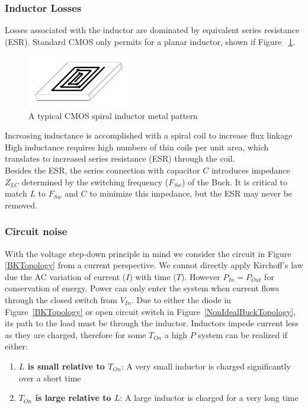 \documentclass[letterpaper,twocolumn,10pt]{article}
\begin{document}
\subsubsection{Inductor Losses} 
Losses associated with the inductor are dominated by equivalent series resistance (ESR). Standard CMOS only permits for a planar inductor, shown if Figure ~\ref{SpiralInductor}. 
\begin{figure}[here]
\includegraphics[width=0.4\textwidth]{Spiralinductor}
\caption{A typical CMOS spiral inductor metal pattern}
\label{SpiralInductor}
\end{figure}
Increasing inductance is accomplished with a spiral coil to increase flux linkage High inductance requires high numbers of thin coils per unit area, which translates to increased series resistance (ESR) through the coil.\\
Besides the ESR, the series connection with capacitor $C$ introduces impedance $Z_{LC}$ determined by the switching frequency ($F_{Sw}$) of the Buck. It is critical to match $L$ to $F_{Sw}$ and $C$ to minimize this impedance, but the ESR may never be removed.\\  
\subsubsection{Circuit noise }
With the voltage step-down principle in mind we consider the circuit in Figure \ref{BKTopology} from a current perspective. We cannot directly apply Kirchoff's law due the AC variation of current ($I$) with time ($T$). However $P_{In} = P_{Out}$ for conservation of energy. Power can only enter the system when current flows through the closed switch from $V_{In}$. Due to either the diode in Figure~\ref{BKTopology} or open circuit switch in Figure~\ref{NonIdealBuckTopology}, its path to the load must be through the inductor. Inductors impede current less as they are charged, therefore for some $T_{On}$ a high $P$ system can be realized if either:\\
\begin{enumerate}
\item{\textbf{$L$ is small relative to $T_{On}$}: A very small inductor is charged significantly over a short time}
\item{\textbf{$T_{On}$ is large relative to $L$}: A large inductor is charged for a very long time}
\end{enumerate}
\end{document}
